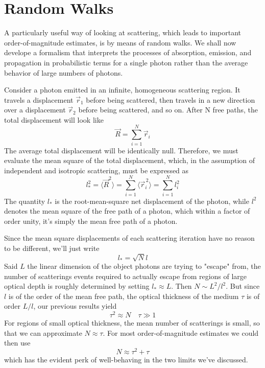 \section{Random Walks}
A particularly useful way of looking at scattering, which leads to important order-of-magnitude estimates, is by means of random walks. We shall now develope a formalism that interprets the processes of absorption, emission, and propagation in probabilistic terms for a single photon rather than the average behavior of large numbers of photons.
\par Consider a photon emitted in an infinite, homogeneous scattering region. It travels a displacement $\vec{r}_{1}$ before being scattered, then travels in a new direction over a displacement $\vec{r}_{2}$ before being scattered, and so on. After N free paths, the total displacement will look like 
\begin{equation*}
    \vec{R} = \sum_{i=1}^{N}\vec{r}_{i}
\end{equation*}
The average total displacement will be identically null. Therefore, we must evaluate the mean square of the total displacement, which, in the assumption of independent and isotropic scattering, must be expressed as 
\begin{equation*}
    l_{*}^{2} = \langle\vec{R}^{2}\rangle = \sum_{i=1}^{N}\langle\vec{r}_{i}^{\,2}\rangle = \sum_{i=1}^{N} l^{2}_{i}
\end{equation*}
The quantity $l_{*}$ is the root-mean-square net displacement of the photon, while $l^{2}$ denotes the mean square of the free path of a photon, which within a factor of order unity, it's simply the mean free path of a photon.
\par Since the mean square displacements of each scattering iteration have no reason to be different, we'll just write 
\begin{equation*}
    l_{*} = \sqrt{N}l
\end{equation*}
Said $L$ the linear dimension of the object photons are trying to "escape" from, the number of scatterings events required to actually escape from regions of large optical depth is roughly determined by setting $l_{*} \approx L$. Then $N \sim L^{2}/l^{2}$. But since $l$ is of the order of the mean free path, the optical thickness of the medium $\tau$ is of order $L/l$, our previous results yield
\begin{equation*}
    \tau^{2} \approx N \quad \tau \gg 1
\end{equation*}
For regions of small optical thickness, the mean number of scatterings is
small, so that we can approximate $N\approx \tau$. For most order-of-magnitude estimates we could then use
\begin{equation*}
    N \approx \tau^{2} + \tau
\end{equation*}
which has the evident perk of well-behaving in the two limits we've discussed.
